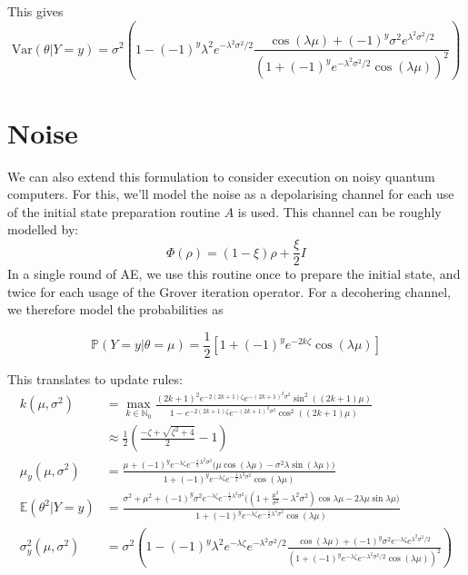 \documentclass[]{report}
\begin{document}
This gives
\[
\text{Var}(\theta | Y = y) = \sigma^2 \left( 1 - (-1)^y \lambda^2 e^{- \lambda^2 \sigma^2 /2} \frac{\cos (\lambda \mu) + (-1)^y\sigma^2 e^{\lambda^2 \sigma^2 /2}}{(1 + (-1)^y e^{- \lambda^2 \sigma^2 / 2} \cos  ( \lambda \mu))^2}\right)
\]

\section{Noise}
We can also extend this formulation to consider execution on noisy quantum computers. For this, we'll model the noise as a depolarising channel for each use of the initial state preparation routine $A$ is used. 
This channel can be roughly modelled by:
\[
\Phi(\rho) = (1 - \xi) \rho + \frac{\xi}{2} I
\]
In a single round of AE, we use this routine once to prepare the initial state, and twice for each usage of the Grover iteration operator. For a decohering channel, we therefore model the probabilities as 

\[
\mathbb{P}(Y = y| \theta = \mu)  = \frac{1}{2}\left[1 + (-1)^y e^{- 2k \zeta} \cos(\lambda \mu)\right]
\] 

This translates to update rules:
\begin{align*}
	k(\mu, \sigma^2)  &= \max_{k \in \mathbb{N}_0} \frac{(2k+1)^2 e^{-2 (2k+1) \zeta} e^{-(2k+1)^2\sigma^2} \sin^2((2k+1)\mu)}{1- e^{-2 (2k+1)\zeta }e^{-(2k+1)^2\sigma^2} \cos^2((2k+1)\mu)} \\
	& \approx \frac{1}{2}\left( \frac{- \zeta + \sqrt{\zeta^2 + 4}}{2} - 1\right) \\
	\mu_{y}(\mu, \sigma^2) &= \frac{\mu + (-1)^y e^{-\lambda \zeta} e^{-\frac{1}{2}\lambda^2\sigma^2}\big(\mu\cos(\lambda\mu) - \sigma^2\lambda \sin(\lambda\mu)\big)}{1+(-1)^y e^{-\lambda \zeta} e^{-\frac{1}{2}\lambda^2\sigma^2}\cos(\lambda\mu)} \\
	    \mathbb{E}(\theta^2 | Y=y) &= \frac{\sigma^2 + \mu^2+ (-1)^y \sigma^2 e^{-\lambda \zeta}e^{-\frac{1}{2}\lambda^2\sigma^2}\Big((1 + \frac{\mu^2}{\sigma^2} - \lambda^2\sigma^2)\cos{\lambda \mu} - 2\lambda \mu \sin{\lambda \mu}\Big)}{1+(-1)^ye^{-\lambda \zeta}e^{-\frac{1}{2}\lambda^2\sigma^2}\cos(\lambda\mu)} \\
	\sigma^2_{y}(\mu, \sigma^2) &= \sigma^2 \left( 1 - (-1)^y \lambda^2 e^{-\lambda \zeta} e^{- \lambda^2 \sigma^2 /2} \frac{\cos (\lambda \mu) + (-1)^y\sigma^2 e^{-\lambda \zeta} e^{\lambda^2 \sigma^2 /2}}{(1 + (-1)^y e^{-\lambda \zeta} e^{- \lambda^2 \sigma^2 / 2} \cos  ( \lambda \mu))^2}\right)
\end{align*}
\end{document}
